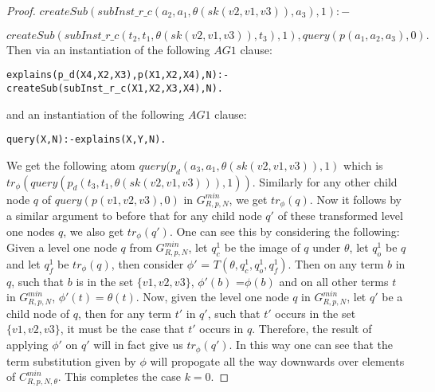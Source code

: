 \begin{proof}
$createSub(subInst\_r\_c(a_{2},a_{1},\theta(sk(v2,v1,v3)),a_{3}),1):-$  

$createSub(subInst\_r\_c(t_{2},t_{1},\theta(sk(v2,v1,v3)),t_{3}),1),query(p(a_{1},a_{2},a_{3}),0).$\\
Then via an instantiation of the following $AG1$ clause:
\begin{lstlisting}[frame=none]
explains(p_d(X4,X2,X3),p(X1,X2,X4),N):-
createSub(subInst_r_c(X1,X2,X3,X4),N).    
\end{lstlisting}
and an instantiation of the following $AG1$ clause:
\begin{lstlisting}[frame=none]
query(X,N):-explains(X,Y,N). 
\end{lstlisting}
   

We get the following atom $query(p_{d}(a_{3},a_{1},\theta(sk(v2,v1,v3)),1)$ which is $tr_{\phi}(query(p_{d}(t_{3},t_{1},\theta(sk(v2,v1,v3))),1))$. Similarly for any other child node $q$ of $query(p(v1,v2,v3),0)$ in $G_{R,p,N}^{min}$, we get $tr_{\phi}(q)$. Now it follows by a similar argument to before that for any child node $q'$ of these transformed level one nodes $q$, we also get $tr_{\phi}(q')$. One can see this by considering the following: Given a level one node $q$ from $G_{R,p,N}^{min}$, let $q_{c}^{1}$ be the image of $q$ under $\theta$, let $q_{o}^{1}$ be $q$ and let $q_{f}^{1}$ be $tr_{\phi}(q)$, then consider $\phi'$ = $T(\theta, q_{c}^{1},q_{o}^{1},q_{f}^{1})$. Then on any term $b$ in $q$, such that $b$ is in the set $\{v1,v2,v3\}$, $\phi'(b)$ =$\phi(b)$ and on all other terms $t$ in $G_{R,p,N}^{min}$, $\phi'(t)=\theta(t)$. Now, given the level one node $q$ in $G_{R,p,N}^{min}$, let $q'$ be a child node of $q$, then for any term $t'$ in $q'$, such that $t'$ occurs in the set $\{v1,v2,v3\}$, it must be the case that $t'$ occurs in $q$. Therefore, the result of applying $\phi'$ on $q'$ will in fact give us $tr_{\phi}(q')$. In this way one can see that the term substitution given by $\phi$ will propogate all the way downwards over elements of $C_{R,p,N,\theta}^{min}$. This completes the case $k=0$. 


\end{proof}
